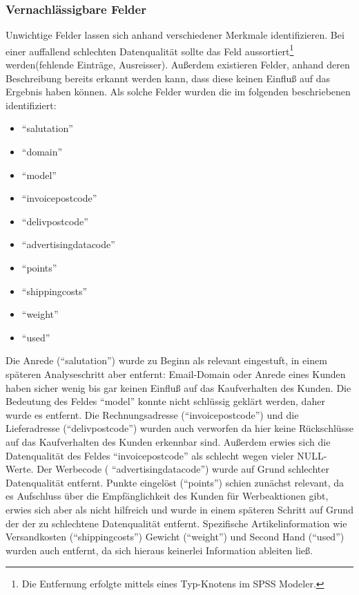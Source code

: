 \documentclass[a4paper,12pt]{article}
\begin{document}
\subsubsection{Vernachlässigbare Felder}
Unwichtige Felder lassen sich anhand verschiedener Merkmale identifizieren. Bei einer
auffallend schlechten Datenqualität sollte das Feld aussortiert\footnote{Die Entfernung erfolgte mittels eines Typ-Knotens im SPSS Modeler.} werden(fehlende Einträge, Ausreisser).
Außerdem existieren Felder, anhand deren Beschreibung bereits erkannt werden
kann, dass diese keinen Einfluß auf das Ergebnis haben können. Als solche Felder wurden die im folgenden beschriebenen identifiziert:
\par
\vspace{1cm}
\begin{minipage}[h]{.5\textwidth}
\begin{itemize}
	\item "`salutation"'
	\item "`domain"'
	\item "`model"'
	\item "`invoicepostcode"'
	\item "`delivpostcode"'
\end{itemize}
\end{minipage}
\hfill
\begin{minipage}[h]{.5\textwidth}
\begin{itemize}
  \item "`advertisingdatacode"'
	\item "`points"'
	\item "`shippingcosts"'
	\item "`weight"'
	\item "`used"'
	\end{itemize}
\end{minipage}
\par
\vspace{1cm}
Die Anrede ("`salutation"') wurde zu Beginn als relevant eingestuft, in einem späteren Analyseschritt aber entfernt:
Email-Domain oder Anrede  eines Kunden haben sicher wenig bis gar keinen Einfluß auf das Kaufverhalten des Kunden. Die Bedeutung des Feldes "`model"' konnte nicht schlüssig geklärt werden, daher wurde es entfernt.
Die Rechnungsadresse ("`invoicepostcode"') und die Lieferadresse ("`delivpostcode"') wurden auch verworfen da hier keine Rückschlüsse auf das Kaufverhalten des Kunden erkennbar sind. Außerdem erwies sich die Datenqualität des Feldes "`invoicepostcode"' als schlecht wegen vieler NULL-Werte.
Der Werbecode ( "`advertisingdatacode"') wurde auf Grund schlechter Datenqualität entfernt. Punkte eingelöst ("`points"') schien zunächst relevant, da es Aufschluss über die Empfänglichkeit des Kunden für Werbeaktionen gibt, erwies sich aber als nicht hilfreich und wurde in einem späteren Schritt auf Grund der der zu schlechtene Datenqualität entfernt. Spezifische Artikelinformation wie Versandkosten ("`shippingcosts"') Gewicht ("`weight"') und Second Hand ("`used"') wurden auch entfernt, da sich hieraus keinerlei Information ableiten ließ.
\end{document}
